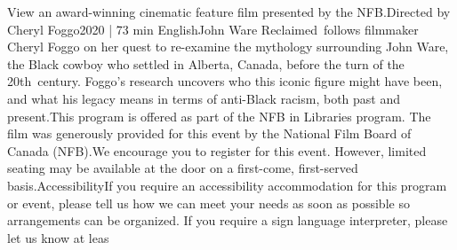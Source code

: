 \documentclass[letterpaper, 10pt]{article}
\begin{document}
\begin{multicols}{2}
{View an award-winning cinematic feature film presented by the NFB.Directed by Cheryl Foggo2020 | 73 min EnglishJohn Ware Reclaimed follows filmmaker Cheryl Foggo on her quest to re-examine the mythology surrounding John Ware, the Black cowboy who settled in Alberta, Canada, before the turn of the 20th century. Foggo’s research uncovers who this iconic figure might have been, and what his legacy means in terms of anti-Black racism, both past and present.This program is offered as part of the NFB in Libraries program. The film was generously provided for this event by the National Film Board of Canada (NFB).We encourage you to register for this event. However, limited seating may be available at the door on a first-come, first-served basis.AccessibilityIf you require an accessibility accommodation for this program or event, please tell us how we can meet your needs as soon as possible so arrangements can be organized. If you require a sign language interpreter, please let us know at leas
}
\vspace{10px}
\end{multicols}
\end{document}
